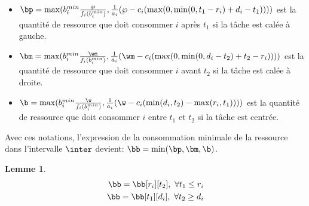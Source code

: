 \documentclass{report}
\newcommand{\bmin}{b_i^{min}}
\newtheorem{Lem}{Lemme}
\begin{document}
\begin{itemize}
\item $\bp=\max(\bmin \frac{\wp}{f_i(\bmin)},\frac{1}{a_i}(\wp - c_i(\max(0,\min(0,t_1-r_i)+d_i-t_1))))$ est la quantité de ressource que doit 
consommer $i$ après $t_1$ si la tâche est calée à gauche.
\item $\bm=\max(\bmin \frac{\wm}{f_i(\bmin)},\frac{1}{a_i}(\wm - c_i(\max(0,\min(0,d_i-t_2)+t_2-r_i))))$ est la quantité de ressource que doit 
consommer $i$ avant $t_2$ si la tâche est calée à droite.	
\item $\b =\max(\bmin \frac{\w}{f_i(\bmin)},
  \frac{1}{a_i}(\w - c_i(\min(d_i,t_2)-\max(r_i,t_1))))$ est la quantité 
  de ressource que doit consommer $i$ entre $t_1$ et $t_2$ si la tâche 
  est centrée.\\
\end{itemize}


Avec ces notations, l'expression de la consommation minimale de la ressource dans l'intervalle 
$\inter$ devient: $\bb=\min(\bp,\bm,\b)$.\\

\begin{Lem}
	\begin{align}
	\bb=\bb[r_i][t_2],\ \forall t_1\le r_i \label{indepbt1}\\
	\bb=\bb[t_1][d_i],\ \forall t_2\ge d_i \label{indepbt2}
	\end{align}
\end{Lem}
\end{document}
